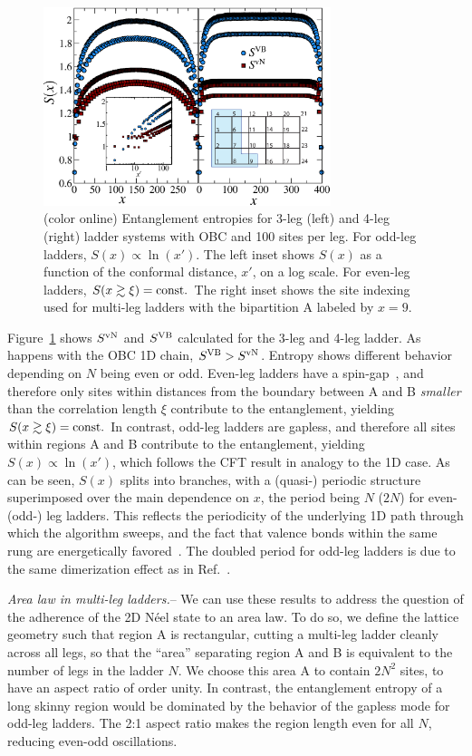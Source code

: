 \documentclass[prl,aps,twocolumn,floatfix,amsmath,amssymb,superscriptaddress,tightenlines]{revtex4}
\begin{document}
\begin{figure} { \includegraphics[width=3.3in]{FIG23NEW.eps}
\caption{(color online) Entanglement entropies for 3-leg (left)
and 4-leg (right) ladder systems with OBC and 100 sites per leg.  For
odd-leg ladders, $S(x)\propto\ln(x')$.  The left
inset shows $S(x)$ as a function of the conformal distance, $x'$, on a log
scale. For even-leg ladders, $S(x\gtrsim\xi)= {\rm const}.$
The right inset shows the site indexing used for multi-leg ladders with the
bipartition A labeled by $x=9$.  \label{ladder} }} \end{figure}

Figure~\ref{ladder} shows $S^{ \rm vN}$ and $S^{\rm VB}$ calculated for
the 3-leg and 4-leg ladder. As happens with the OBC 1D chain, $S^{\rm VB}
> S^{ \rm vN}$.  
Entropy shows different behavior depending on $N$ being even or odd.
Even-leg ladders have a spin-gap~\cite{White1994}, and therefore only
sites within distances from the boundary between A and B {\it smaller}
than the correlation length $\xi$ contribute to the entanglement, yielding
$S(x\gtrsim \xi)= {\rm const}.$ In contrast, odd-leg ladders are gapless,
and therefore all sites within regions A and B contribute to the
entanglement, yielding $S(x)\propto\ln(x')$, which follows the CFT result
in analogy to the 1D case. As can be seen, $S(x)$ splits into branches,
with a (quasi-) periodic structure superimposed over the main dependence
on $x$, the period being $N$ ($2N$) for even- (odd-) leg ladders. This
reflects the periodicity of the underlying 1D path through which the
algorithm sweeps, and the fact that valence bonds within the same rung are
energetically favored~\cite{White1994}. The doubled period for odd-leg
ladders is due to the same dimerization effect as in Ref.~\cite{Ian1}.

{\it Area law in multi-leg ladders.}--  
We can use these results to address the question of the adherence of the 2D N\'eel state
to an area law.  To do so, we
define the lattice
geometry such that region A is rectangular, cutting a multi-leg ladder
cleanly across all legs, so that the ``area'' separating region A and B is
equivalent to the number of legs in the ladder $N$.  We choose this area A
to contain $2N^2$ sites, to have an aspect ratio of order unity.  In
contrast, the entanglement entropy of a long
skinny region would be dominated by the behavior
of the gapless mode for odd-leg ladders.
The 2:1 aspect ratio makes the region length even for all $N$, reducing even-odd oscillations.
\end{document}
